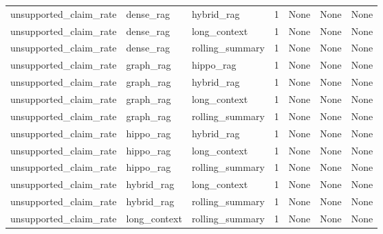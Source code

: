 \begin{tabular}{lllllll}
unsupported\_claim\_rate & dense\_rag & hybrid\_rag & 1 & None & None & None \\
unsupported\_claim\_rate & dense\_rag & long\_context & 1 & None & None & None \\
unsupported\_claim\_rate & dense\_rag & rolling\_summary & 1 & None & None & None \\
unsupported\_claim\_rate & graph\_rag & hippo\_rag & 1 & None & None & None \\
unsupported\_claim\_rate & graph\_rag & hybrid\_rag & 1 & None & None & None \\
unsupported\_claim\_rate & graph\_rag & long\_context & 1 & None & None & None \\
unsupported\_claim\_rate & graph\_rag & rolling\_summary & 1 & None & None & None \\
unsupported\_claim\_rate & hippo\_rag & hybrid\_rag & 1 & None & None & None \\
unsupported\_claim\_rate & hippo\_rag & long\_context & 1 & None & None & None \\
unsupported\_claim\_rate & hippo\_rag & rolling\_summary & 1 & None & None & None \\
unsupported\_claim\_rate & hybrid\_rag & long\_context & 1 & None & None & None \\
unsupported\_claim\_rate & hybrid\_rag & rolling\_summary & 1 & None & None & None \\
unsupported\_claim\_rate & long\_context & rolling\_summary & 1 & None & None & None \\
\end{tabular}
